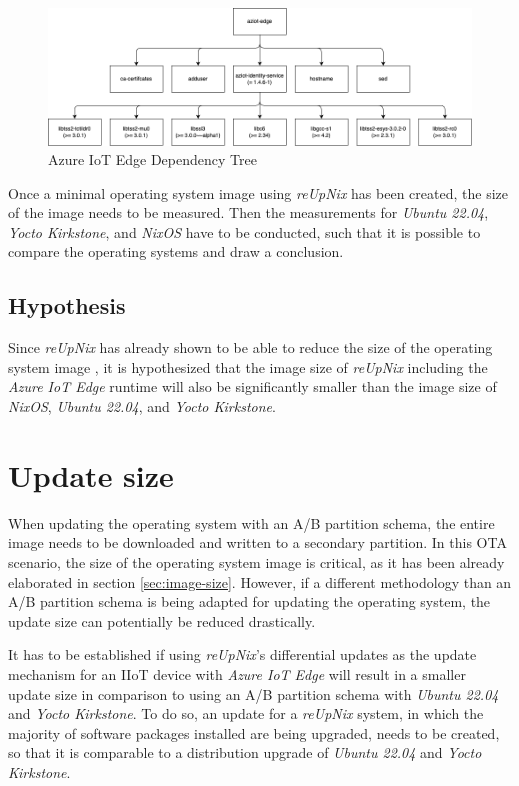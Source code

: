 \begin{figure}[H]
    \centering
    \includegraphics[width=\textwidth]{fig/dependecy-tree.drawio.png}
    \caption{Azure IoT Edge Dependency Tree}
    \label{fig:dependency-tree}
\end{figure}

\noindent
Once a minimal operating system image using \textit{reUpNix} has been created, the size of the image
needs to be measured. Then the measurements for
\textit{Ubuntu 22.04}, \textit{Yocto Kirkstone}, and \textit{NixOS} have to be conducted, such that
it is possible to compare the operating systems and draw a conclusion.

\subsection{Hypothesis}
Since \textit{reUpNix} has already shown to be able to reduce the size of the
operating system image \cite{gollenstede:23:lctes}, it is hypothesized that the
image size of \textit{reUpNix} including the \textit{Azure IoT Edge} runtime
will also be significantly smaller than the image size of \textit{NixOS},
\textit{Ubuntu 22.04}, and \textit{Yocto Kirkstone}.


\section{Update size}
\label{sec:update-size}
When updating the operating system with an A/B partition schema, the entire
image needs to be downloaded and written to a secondary partition. In this
\ac{OTA} scenario, the size of the operating system image is critical, as it has been
already elaborated in section \ref{sec:image-size}.
However, if a different methodology than an A/B partition schema is being adapted
for updating the operating system, the update size can potentially be reduced
drastically.

It has to be established if using \textit{reUpNix}'s differential updates as the
update mechanism for an \ac{IIoT} device with \textit{Azure IoT Edge}
will result in a smaller update size in comparison to using an A/B partition schema with
\textit{Ubuntu 22.04} and \textit{Yocto Kirkstone}. To do so, an update for a \textit{reUpNix} system,
in which the majority of software packages installed are being upgraded,
needs to be created, so that it is comparable
to a distribution upgrade of \textit{Ubuntu 22.04} and \textit{Yocto Kirkstone}.

